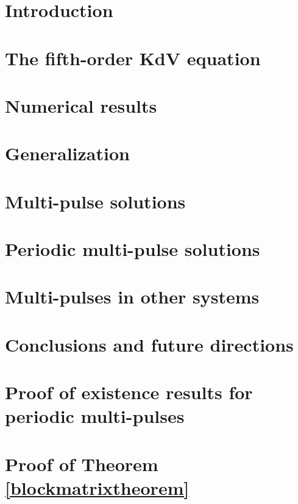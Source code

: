 \documentclass[11pt,reqno,oneside]{report}
\theoremstyle{plain}
\theoremstyle{definition}
\theoremstyle{remark}
\numberwithin{section}{chapter}
\numberwithin{equation}{chapter}
\numberwithin{figure}{chapter}
\begin{document}
\chapter{Introduction}\label{chapter:intro}


\chapter{The fifth-order KdV equation}\label{chapter:KdV5}


\chapter{Numerical results}\label{chapter:KdV5numerics}


\chapter{Generalization}\label{chapter:kdv5general}



\chapter{Multi-pulse solutions}\label{chapter:kdv5homoclinic}


\chapter{Periodic multi-pulse solutions }\label{chapter:kdv5periodic}


\chapter{Multi-pulses in other systems}\label{chapter:other}


\chapter{Conclusions and future directions}


\appendix

\chapter{Proof of existence results for periodic multi-pulses}\label{perexistproof}


\chapter{Proof of Theorem \ref{blockmatrixtheorem}}\label{blockmatrixproof}


\end{document}
